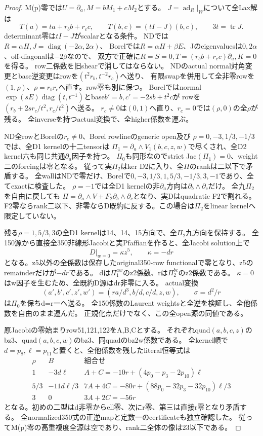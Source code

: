 \documentclass[a4paper,11pt]{ltjsarticle}
\theoremstyle{definition}
\begin{document}
\begin{proof}
M(p)零では$U=\partial_a,M=bM_1+cM_2$とする。
$J=\operatorname{ad}_R|_W$について全Lax解は
\[
 T(a)=ta+r_bb+r_cc,\qquad T(b,c)=(tI-J)(b,c),\qquad3t=\operatorname{tr}J.
\]
determinant零は$tI-J$がscalarとなる条件。
NDでは$R=\alpha H,J=\operatorname{diag}(-2\alpha,2\alpha)$、
Borelでは$R=\alpha H+\beta E$、Jのeigenvaluesは$0,2\alpha$、off-diagonalは$-2\beta$なので、
双方で正確に$R=S=0,T=(r_bb+r_cc)\partial_a,K=0$を得る。
row二係数を旧shearで消してはならない。
NDのactual normal対角変更とbase逆変更はrowを$(t^2r_b,t^{-2}r_c)$へ送り、
有限swapを併用して全非零rowを$(1,\rho)$、$\rho=r_br_c$へ直す。row零も別に保つ。
Borelではnormal$\exp(sE)\operatorname{diag}(t,t^{-1})$とbase$b'=b,c'=-2sb+t^2c$が
rowを$(r_b+2sr_c/t^2,r_c/t^2)$へ送る。
$r_c\ne0$は$(0,1)$へ直り、$r_c=0$では$(\rho,0)$の全$\rho$が残る。
全inverseを持つactual変換で、全higher係数を運ぶ。

ND全rowとBorelの$r_c\ne0$、Borel rowlineのgeneric open及び
$\rho=0,-3,1/3,-1/3$では、全D1 kernelの十二tensorは
$\Pi_1=\partial_a\wedge V_1(b,c,z,w)$で尽くされ、全D2 kernel六も同じ共通$\partial_a$因子を持つ。
$\Pi_0$も同形なのでstrict Jac$(\Pi_1)=0$、weight二のforcingは零となる。
従って実$\Pi_2$はker D2に入り、全$\Pi$のrankは二以下で矛盾する。
全wallはNDで零だけ、Borelで$0,-3,1/3,1,5/3,-1/3,3,-1$であり、全てexactに検査した。
$\rho=-1$では全D1 kernelの非$\partial_a$方向は$\partial_b\wedge\partial_c$だけ。
全九$\Pi_2$を自由に戻しても
$\Pi=\partial_a\wedge V+F_2\partial_b\wedge\partial_c$となり、実Dはquadratic F2で割れる。
F2零ならrank二以下、非零ならD既約に反する。この場合は$\Pi_2$をlinear kernelへ限定していない。

残る$\rho=1,5/3,3$の全D1 kernelは14、14、15方向で、全$\Pi_2$九方向を保持する。
全150源から直接全350非線形Jacobiと実Pfaffianを作ると、全Jacobi solution上で
\[
 D|_{w=0}=\kappa z^5,\qquad\kappa=-dr
\]
となる。z5以外の全係数は保存したoriginal350-row functionalで零となり、z5のremainderだけが$-dr$である。
dは$\Pi_1^{aw}$のz2係数、rは$\Pi_2^{bc}$のz2係数である。
$\kappa=0$はw因子を生むため、全既約D源はdr非零に入る。
actual変換
\[
 (a',b',c',z',w')=(ra/d^3,b/d,c/d,z,w),\qquad\sigma=d^2/r
\]
は$\Pi_0$を保ちd=r一へ送る。
全150係数のLaurent weightsと全逆を検証し、全他係数を自由のまま運んだ。
正規化点だけでなく、この全open源の同値である。

原Jacobiの零始まりrow51,121,122をA,B,Cとする。
それぞれquad$(a,b,c,z)$のbz3、quad$(a,b,c,w)$のbz3、同quadのbz2w係数である。
全kernel順で$d=p_8,\ell=p_{11}$と置くと、全他係数を残したliteral恒等式は
\[
\begin{array}{c|c|l}
 \rho&B&\text{組合せ}\\\hline
 1&-3d\ell&A+C=-10r+(4p_0-p_3-2p_{10})\ell\\
 5/3&-11d\ell/3&7A+4C=-80r+(88p_0-32p_3-32p_{10})\ell/3\\
 3&0&3A+2C=-56r
\end{array}
\]
となる。初めの二型はd非零からell零、次にr零、第三は直接r零となり矛盾する。
全normalized350式の正逆mapと定数一のcertificateも独立確認した。
従ってM(p)零の高重複度全源は空であり、rank二全体の像は23以下である。


\end{proof}
\end{document}
